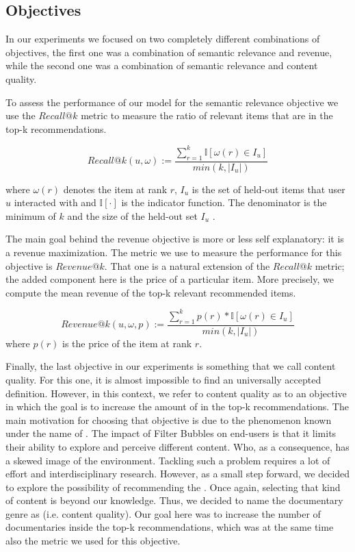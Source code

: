 \documentclass[letterpaper]{article}
\begin{document}
\subsection{Objectives}

In our experiments we focused on two completely different combinations of objectives, the first one was a combination of semantic relevance and revenue, while the second one was a combination of semantic relevance and content quality.

To assess the performance of our model for the semantic relevance objective we use the $Recall@k$ metric to measure the ratio of relevant items that are in the top-k recommendations.

\begin{equation}
\label{eq:recallatk}
    Recall@k(u,\omega) := \frac{\sum_{r=1}^k\mathbb{I}[\omega(r) \in I_u]}{min(k, |I_u|)}
\end{equation}

where $\omega(r)$ denotes the item at rank $r$, $I_u$ is the set of held-out items that user $u$ interacted with and $\mathbb{I}[\cdot]$ is the indicator function. The denominator is the minimum of $k$ and the size of the held-out set $I_u$ \cite{liang2018variational}.

The main goal behind the revenue objective is more or less self explanatory: it is a revenue maximization. The metric we use to measure the performance for this objective is $Revenue@k$. That one is a natural extension of the $Recall@k$ metric; the added component here is the price of a particular item. More precisely, we compute the mean revenue of the top-k relevant recommended items.

\begin{equation}
\label{eq:revenueatk}
    Revenue@k(u,\omega, p) := \frac{\sum_{r=1}^k p(r)*\mathbb{I}[\omega(r) \in I_u]}{min(k, |I_u|)}
\end{equation}
where $p(r)$ is the price of the item at rank $r$. 

Finally, the last objective in our experiments is something that we call content quality. For this one, it is almost impossible to find an universally accepted definition. However, in this context, we refer to content quality as to an objective in which the goal is to increase the amount of  in the top-k recommendations. The main motivation for choosing that objective is due to the phenomenon known under the name of  \cite{nguyen2014exploring}. The impact of Filter Bubbles on end-users is that it limits their ability to explore and perceive different content. Who, as a consequence, has a skewed image of the environment. Tackling such a problem requires a lot of effort and interdisciplinary research. However, as a small step forward, we decided to explore the possibility of recommending the . Once again, selecting that kind of content is beyond our knowledge. Thus, we decided to name the documentary genre as  (i.e. content quality). Our goal here was to increase the number of documentaries inside the top-k recommendations, which was at the same time also the metric we used for this objective.
\end{document}
